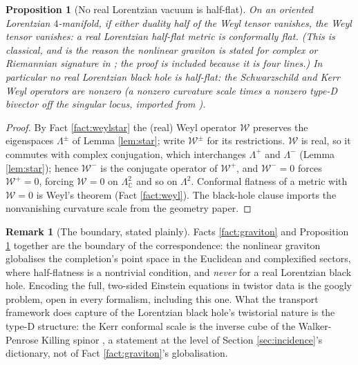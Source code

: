 \documentclass[11pt]{article}
\newtheorem{proposition}[theorem]{Proposition}
\theoremstyle{definition}
\newtheorem{remark}[theorem]{Remark}
\newcommand{\C}{\mathbb{C}}
\begin{document}
\begin{proposition}[No real Lorentzian vacuum is half-flat]\label{prop:lorentz}
On an oriented Lorentzian $4$-manifold, if either duality half of the Weyl tensor vanishes, the Weyl tensor vanishes: a real Lorentzian half-flat metric is conformally flat. (This is classical, and is the reason the nonlinear graviton is stated for complex or Riemannian signature in \cite{Penrose76}; the proof is included because it is four lines.) In particular no real Lorentzian black hole is half-flat: the Schwarzschild and Kerr Weyl operators are nonzero (a nonzero curvature scale times a nonzero type-D bivector off the singular locus, imported from \cite[Prop.~3.3, Fact 6.3]{ButlerT6}).
\end{proposition}

\begin{proof}
By Fact \ref{fact:weylstar} the (real) Weyl operator $\mathcal{W}$ preserves the eigenspaces $\Lambda^\pm$ of Lemma \ref{lem:star}; write $\mathcal{W}^\pm$ for its restrictions. $\mathcal{W}$ is real, so it commutes with complex conjugation, which interchanges $\Lambda^+$ and $\Lambda^-$ (Lemma \ref{lem:star}); hence $\mathcal{W}^-$ is the conjugate operator of $\mathcal{W}^+$, and $\mathcal{W}^- = 0$ forces $\mathcal{W}^+ = 0$, forcing $\mathcal{W} = 0$ on $\Lambda^2_\C$ and so on $\Lambda^2$. Conformal flatness of a metric with $\mathcal{W} = 0$ is Weyl's theorem (Fact \ref{fact:weyl}). The black-hole clause imports the nonvanishing curvature scale from the geometry paper.
\end{proof}

\begin{remark}[The boundary, stated plainly]\label{rem:boundary}
Facts \ref{fact:graviton} and Proposition \ref{prop:lorentz} together are the boundary of the correspondence: the nonlinear graviton globalises the completion's point space in the Euclidean and complexified sectors, where half-flatness is a nontrivial condition, and \emph{never} for a real Lorentzian black hole. Encoding the full, two-sided Einstein equations in twistor data is the googly problem, open in every formalism, including this one. What the transport framework does capture of the Lorentzian black hole's twistorial nature is the type-D structure: the Kerr conformal scale is the inverse cube of the Walker-Penrose Killing spinor \cite[Prop.~6.8]{ButlerT6}, a statement at the level of Section \ref{sec:incidence}'s dictionary, not of Fact \ref{fact:graviton}'s globalisation.
\end{remark}
\end{document}
